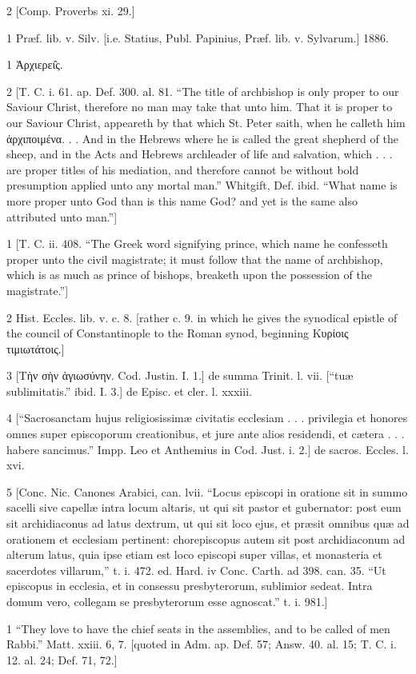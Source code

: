 2
[Comp. Proverbs xi. 29.]

1
Præf. lib. v. Silv. [i.e. Statius, Publ. Papinius, Præf. lib. v. Sylvarum.] 1886.

1
Ἀρχιερει̑ς.

2
[T. C. i. 61. ap. Def. 300. al. 81. “The title of archbishop is only proper to our Saviour Christ, therefore no man may take that unto him. That it is proper to our Saviour Christ, appeareth by that which St. Peter saith, when he calleth him ἀρχιποιμένα. . . And in the Hebrews where he is called the great shepherd of the sheep, and in the Acts and Hebrews archleader of life and salvation, which . . . are proper titles of his mediation, and therefore cannot be without bold presumption applied unto any mortal man.” Whitgift, Def. ibid. “What name is more proper unto God than is this name God? and yet is the same also attributed unto man.”]

1
[T. C. ii. 408. “The Greek word signifying prince, which name he confesseth proper unto the civil magistrate; it must follow that the name of archbishop, which is as much as prince of bishops, breaketh upon the possession of the magistrate.”]

2
Hist. Eccles. lib. v. c. 8. [rather c. 9. in which he gives the synodical epistle of the council of Constantinople to the Roman synod, beginning Κυρίοις τιμιωτάτοις.]

3
[Τὴν σὴν ἁγιωσύνην. Cod. Justin. I. 1.] de summa Trinit. l. vii. [“tuæ sublimitatis.” ibid. I. 3.] de Episc. et cler. l. xxxiii.

4
[“Sacrosanctam hujus religiosissimæ civitatis ecclesiam . . . privilegia et honores omnes super episcoporum creationibus, et jure ante alios residendi, et cætera . . . habere sancimus.” Impp. Leo et Anthemius in Cod. Just. i. 2.] de sacros. Eccles. l. xvi.

5
[Conc. Nic. Canones Arabici, can. lvii. “Locus episcopi in oratione sit in summo sacelli sive capellæ intra locum altaris, ut qui sit pastor et gubernator: post eum sit archidiaconus ad latus dextrum, ut qui sit loco ejus, et præsit omnibus quæ ad orationem et ecclesiam pertinent: chorepiscopus autem sit post archidiaconum ad alterum latus, quia ipse etiam est loco episcopi super villas, et monasteria et sacerdotes villarum,” t. i. 472. ed. Hard. iv Conc. Carth. ad 398. can. 35. “Ut episcopus in ecclesia, et in consessu presbyterorum, sublimior sedeat. Intra domum vero, collegam se presbyterorum esse agnoscat.” t. i. 981.]

1
“They love to have the chief seats in the assemblies, and to be called of men Rabbi.” Matt. xxiii. 6, 7. [quoted in Adm. ap. Def. 57; Answ. 40. al. 15; T. C. i. 12. al. 24; Def. 71, 72.]

